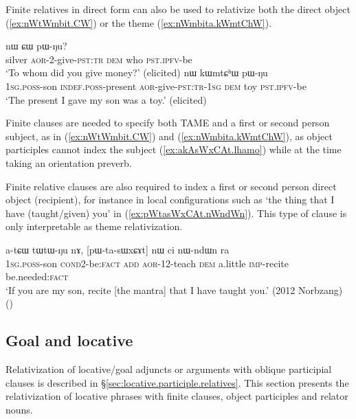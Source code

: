 Finite relatives in direct form can also be used to relativize both the direct object (\ref{ex:nWtWmbit.CW}) or the theme (\ref{ex:nWmbita.kWmtChW}). 

\begin{exe}
\ex 
\begin{xlist}
\ex \label{ex:nWtWmbit.CW}
 nɯ ɕɯ pɯ-ŋu? \\
silver \textsc{aor}-2-give-\textsc{pst}:\textsc{tr} \textsc{dem} who \textsc{pst}.\textsc{ipfv}-be \\
\glt `To whom did you give money?' (elicited)
\ex \label{ex:nWmbita.kWmtChW}
 nɯ kɯmtɕʰɯ pɯ-ŋu \\
 \textsc{1sg}.\textsc{poss}-son \textsc{indef}.\textsc{poss}-present \textsc{aor}-give-\textsc{pst}:\textsc{tr}-\textsc{1sg} \textsc{dem} toy \textsc{pst}.\textsc{ipfv}-be \\
 \glt `The present I gave my son was a toy.' (elicited)
 \end{xlist} 
\end{exe} 

Finite clauses are needed to specify both TAME and a first or second person subject, as in (\ref{ex:nWtWmbit.CW}) and (\ref{ex:nWmbita.kWmtChW}), as object participles cannot index the subject (\ref{ex:akAsWxCAt.lhamo}) while at the time taking an orientation preverb.

Finite relative clauses are also required to index a first or second person direct object (recipient), for instance in local configurations such as  `the thing that I have (taught/given) you' in (\ref{ex:pWtasWxCAt.nWndWn}). This type of clause is only interpretable as theme relativization. 

\begin{exe}
\ex \label{ex:pWtasWxCAt.nWndWn}
\gll  a-tɕɯ tɯ\redp{}tɯ-ŋu nɤ, [pɯ-ta-sɯxɕɤt] nɯ ci nɯ-ndɯn ra \\
\textsc{1sg}.\textsc{poss}-son \textsc{cond}\redp{}2-be:\textsc{fact} \textsc{add} \textsc{aor}-1\fl{}2-teach \textsc{dem} a.little \textsc{imp}-recite be.needed:\textsc{fact} \\
\glt `If you are my son, recite [the mantra] that I have taught you.' (2012 Norbzang)
()
\end{exe} 


\subsection{Goal and locative} \label{sec:locative.relativization}
Relativization of locative/goal adjuncts or arguments with oblique participial clauses  is described in  §\ref{sec:locative.participle.relatives}. This section presents the relativization of locative phrases with finite clauses, object participles and relator nouns.
 

